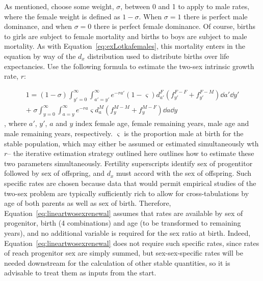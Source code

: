  \FloatBarrier
\label{sec:2sexlinearmain}
As mentioned, choose some weight, $\sigma$, between 0 and 1 to apply to male
rates, where the female weight is defined as $1 - \sigma$. When $\sigma = 1$
there is perfect male dominance, and when $\sigma = 0$ there is perfect female
dominance. Of course, births to girls are subject to female mortality and births
to boys are subject to male mortality. As with
Equation~\eqref{eq:exLotkafemales}, this mortality enters in the equation by way
of the $d_x$ distribution used to distribute births over life expectancies. Use
the following formula to estimate the two-sex intrinsic growth rate, $r$:

\begin{equation}
\label{eq:lineartwosexrenewal}
\begin{split}
1 = (1 - \sigma) 
            \int _{y'=0}^\infty \int _{a'=y'}^\infty e^{-ra'}
                      (1 - \varsigma) d_{a'}^F \left(f_{y'}^{F-F} +
                      f_{y'}^{F-M}\right) \dd a' \dd y' \\ + \;\sigma
            \int _{y=0}^\infty \int _{a=y}^\infty e^{-ra}
                     \varsigma d_{a}^M  \left(f_{y}^{M-M} +
                     f_{y}^{M-F}\right)\dd a \dd y
\end{split}
\end{equation}
, where $a'$, $y'$, $a$ and $y$ index female age, female remaining years, male
age and male remaining years, respectively. $\varsigma$ is the
proportion male at birth for the stable population, which may either be assumed
or estimated simultaneously wth $r$-- the iterative estimation strategy
outlined here outlines how to estimate these two parameters simultaneously.
Fertility superscripts identify sex of progentitor followed by sex of offspring, and $d_x$ must accord with the sex of offspring. Such specific rates are chosen because data that would permit empirical studies of the two-sex problem are typically sufficiently rich to allow for cross-tabulations by age of both parents as well as sex of birth. 
Therefore, Equation~\eqref{eq:lineartwosexrenewal} assumes that rates are
available by sex of progenitor, birth (4 combinations) and age (to be transformed to remaining years), 
and no additional variable is required for the sex ratio at birth. Indeed,
Equation~\ref{eq:lineartwosexrenewal} does not require such specific rates,
since rates of reach progenitor sex are simply summed, but sex-sex-specific
rates will be needed downstream for the calculation of other stable quantities,
so it is advisable to treat them as inputs from the start.

